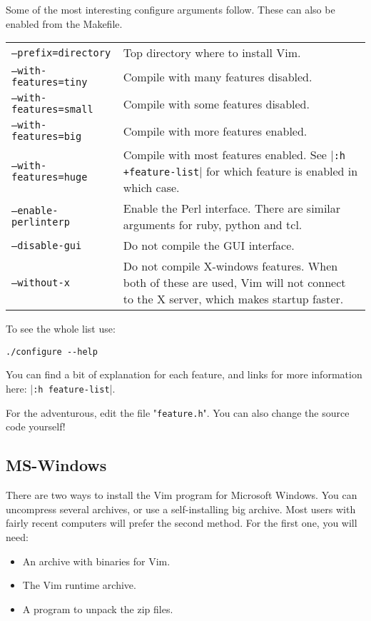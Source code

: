 Some of the most interesting configure arguments follow.
These can also be enabled from the Makefile.

\begin{center} \begin{tabularx}{\textwidth}{l X}
				\texttt{--prefix={directory}} & Top directory where to install Vim. \\
				\texttt{--with-features=tiny} & Compile with many features disabled. \\
				\texttt{--with-features=small} & Compile with some features disabled. \\
				\texttt{--with-features=big} & Compile with more features enabled. \\
				\texttt{--with-features=huge} & Compile with most features enabled.  See |\texttt{:h +feature-list}| for which feature is enabled in which case. \\
				\texttt{--enable-perlinterp} & Enable the Perl interface.  There are similar arguments for ruby, python and tcl. \\
				\texttt{--disable-gui} & Do not compile the GUI interface. \\
				\texttt{--without-x} & Do not compile X-windows features.  When both of these are used, Vim will not connect to the X server, which makes startup faster. \\
\end{tabularx} \end{center}

To see the whole list use:

\begin{Verbatim}[samepage=true]
 ./configure --help
\end{Verbatim}

You can find a bit of explanation for each feature, and links for more information here: |\verb!:h feature-list!|.

For the adventurous, edit the file "\verb!feature.h!".
You can also change the source code yourself!
\subsection{MS-Windows}
There are two ways to install the Vim program for Microsoft Windows.
You can uncompress several archives, or use a self-installing big archive.
Most users with fairly recent computers will prefer the second method.
For the first one, you will need:

\begin{itemize}
    \item An archive with binaries for Vim.
    \item The Vim runtime archive.
    \item A program to unpack the zip files.
\end{itemize}

